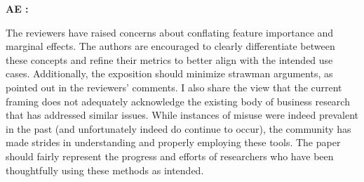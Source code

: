 \documentclass[11pt]{article}
\newcounter{se}[section]
\newcounter{aed}[section]
\newenvironment{aed}[1][]{%
    \refstepcounter{aed}\par\medskip\noindent%
    \textbf{AE \theaed: #1}\rmfamily\itshape%
}{\medskip}
\newcounter{reviewer}
\newcounter{point}[reviewer]
\begin{document}
\begin{aed}
    The reviewers have raised concerns about conflating feature importance and marginal effects. The authors are encouraged to clearly differentiate between these concepts and refine their metrics to better align with the intended use cases. Additionally, the exposition should minimize strawman arguments, as pointed out in the reviewers' comments. I also share the view that the current framing does not adequately acknowledge the existing body of business research that has addressed similar issues. While instances of misuse were indeed prevalent in the past (and unfortunately indeed do continue to occur), the community has made strides in understanding and properly employing these tools. The paper should fairly represent the progress and efforts of researchers who have been thoughtfully using these methods as intended.
\end{aed}
\end{document}
